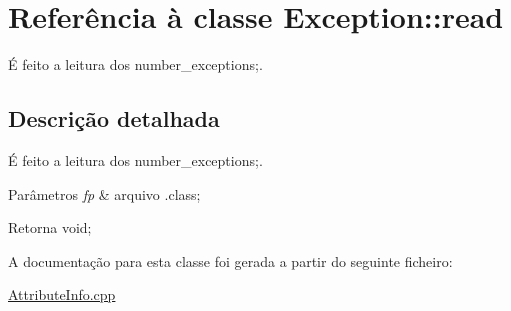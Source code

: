 \hypertarget{class_exception_1_1read}{}\section{Referência à classe Exception\+:\+:read}
\label{class_exception_1_1read}


É feito a leitura dos number\+\_\+exceptions;.  




\subsection{Descrição detalhada}
É feito a leitura dos number\+\_\+exceptions;. 


\begin{DoxyParams}{Parâmetros}
{\em fp} & arquivo .class; \\
\hline
\end{DoxyParams}
\begin{DoxyReturn}{Retorna}
void; 
\end{DoxyReturn}


A documentação para esta classe foi gerada a partir do seguinte ficheiro\+:\begin{DoxyCompactItemize}
\item 
\hyperlink{_attribute_info_8cpp}{Attribute\+Info.\+cpp}\end{DoxyCompactItemize}
